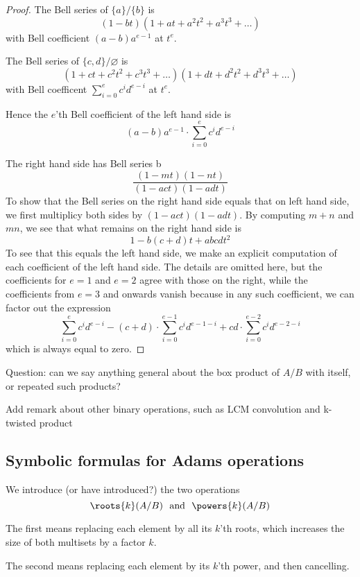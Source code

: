 \documentclass[a4paper]{article}
\begin{document}
\begin{proof}
The Bell series of $\{  a \} / \{ b \}$ is 
$$(1-bt) (1+at+a^2 t^2 + a^3 t^3 + \ldots)$$
with Bell coefficient $(a-b) a^{e-1}$ at $t^e$. 

The Bell series of $\{  c,d \} / \varnothing$ is 
$$   (1+ct+c^2 t^2 + c^3 t^3 + \ldots) (1+dt+d^2 t^2 + d^3 t^3 + \ldots)  $$
with Bell coefficent $\sum_{i=0}^e c^i d^{e-i}$ at $t^e$.

Hence the $e$'th Bell coefficient of the left hand side is
$$   (a-b) a^{e-1} \cdot \sum_{i=0}^e c^i d^{e-i}  $$

The right hand side has Bell series
b$$  \frac{(1-mt)(1-nt)}{(1-act) ( 1-adt)}  $$
To show that the Bell series on the right hand side equals that on left hand side, we first multiplicy both sides by $(1-act) ( 1-adt)$. By computing $m+n$ and $mn$, we see that what remains on the right hand side is 
$$  1 - b(c+d) t + abcd t^2 $$
To see that this equals the left hand side, we make an explicit computation of each coefficient of the left hand side. The details are omitted here, but the coefficients for $e=1$ and $e=2$ agree with those on the right, while the coefficients from $e=3$ and onwards vanish because in any such coefficient, we can factor out the expression
$$   \sum_{i=0}^e c^i d^{e-i} - (c+d) \cdot \sum_{i=0}^{e-1} c^i d^{e-1-i} + cd \cdot \sum_{i=0}^{e-2} c^i d^{e-2-i}  $$
which is always equal to zero.
\end{proof}



Question: can we say anything general about the box product of $A/B$ with itself, or repeated such products?

Add remark about other binary operations, such as LCM convolution and k-twisted product



\subsection{Symbolic formulas for Adams operations}

We introduce (or have introduced?) the two operations
$$ \roots{k}(A/B)   \ \ \text{and} \ \ \powers{k}(A/B)$$

The first means replacing each element by all its $k$'th roots, which increases the size of both multisets by a factor $k$.

The second means replacing each element by its $k$'th power, and then cancelling.
\end{document}
